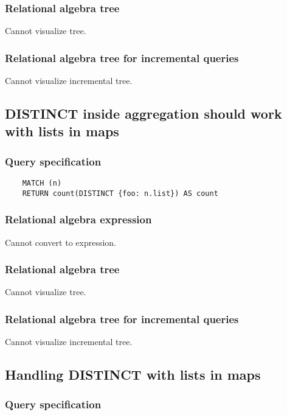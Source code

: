 	\subsubsection*{Relational algebra tree}

	Cannot visualize tree.

	\subsubsection*{Relational algebra tree for incremental queries}

	Cannot visualize incremental tree.
	\subsection{DISTINCT inside aggregation should work with lists in maps}

	\subsubsection*{Query specification}

	\begin{lstlisting}
	MATCH (n)
	RETURN count(DISTINCT {foo: n.list}) AS count
	\end{lstlisting}


	\subsubsection*{Relational algebra expression}

	Cannot convert to expression.

	\subsubsection*{Relational algebra tree}

	Cannot visualize tree.

	\subsubsection*{Relational algebra tree for incremental queries}

	Cannot visualize incremental tree.
	\subsection{Handling DISTINCT with lists in maps}

	\subsubsection*{Query specification}

